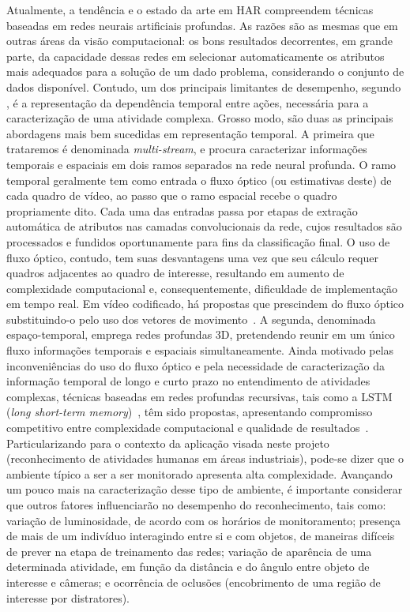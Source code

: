 Atualmente, a tendência e o estado da arte em HAR compreendem técnicas baseadas em redes neurais artificiais profundas. As razões são as mesmas que em outras áreas da visão computacional: os bons resultados decorrentes, em grande parte, da capacidade dessas redes em selecionar automaticamente os atributos mais adequados para a solução de um dado problema, considerando o conjunto de dados disponível. Contudo, um dos principais limitantes de desempenho, segundo \textcite{yao-2019}, é a representação da dependência temporal entre ações, necessária para a caracterização de uma atividade complexa. 
Grosso modo, são duas as principais abordagens mais bem sucedidas em representação temporal. A primeira que trataremos é denominada \emph{multi-stream}, e procura caracterizar informações temporais e espaciais em dois ramos separados na rede neural profunda. O ramo temporal geralmente tem como entrada o fluxo óptico (ou estimativas deste) de cada quadro de vídeo, ao passo que o ramo espacial recebe o quadro propriamente dito. Cada uma das entradas passa por etapas de extração automática de atributos nas camadas convolucionais da rede, cujos resultados são processados e fundidos oportunamente para fins da classificação final. O uso de fluxo óptico, contudo, tem suas desvantagens uma vez que seu cálculo requer quadros adjacentes ao quadro de interesse, resultando em aumento de complexidade computacional e, consequentemente, dificuldade de implementação em tempo real. Em vídeo codificado, há propostas que prescindem do fluxo óptico substituindo-o pelo uso dos vetores de movimento~\parencite{yao-2019}. A segunda, denominada espaço-temporal, emprega redes profundas 3D, pretendendo reunir em um único fluxo informações temporais e espaciais simultaneamente. Ainda motivado pelas inconveniências do uso do fluxo óptico e pela necessidade de caracterização da informação temporal de longo e curto prazo no entendimento de atividades complexas, técnicas baseadas em redes profundas recursivas, tais como a LSTM (\emph{long short-term memory})~\parencite{hochreiter-1997}, têm sido propostas, apresentando compromisso competitivo entre complexidade computacional e qualidade de resultados~\parencite{donahue-2016, herath-2017, xia-2020}.
%
%
Particularizando para o contexto da aplicação visada neste projeto (reconhecimento de atividades humanas em áreas industriais), pode-se dizer que o ambiente típico a ser a ser monitorado apresenta alta complexidade. Avançando um pouco mais na caracterização desse tipo de ambiente, é importante considerar que outros fatores influenciarão no desempenho do reconhecimento, tais como: variação de luminosidade, de acordo com os horários de monitoramento; presença de mais de um indivíduo interagindo entre si e com objetos, de maneiras difíceis de prever na etapa de treinamento das redes; variação de aparência de uma determinada atividade, em função da distância e do ângulo entre objeto de interesse e câmeras; e ocorrência de oclusões (encobrimento de uma região de interesse por distratores).
